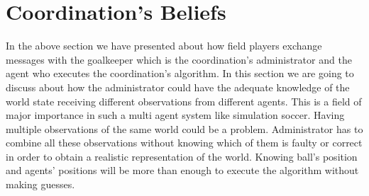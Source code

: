 \section{Coordination's Beliefs}
In the above section we have presented about how field players exchange messages with the goalkeeper which is the coordination's administrator and the agent who executes the coordination's algorithm. In this section we are going to discuss about how the administrator could have the adequate knowledge of the world state receiving different observations from different agents. This is a field of major importance in such a multi agent system like simulation soccer. Having multiple observations of the same world could be a problem. Administrator has to combine all these observations without knowing which of them is faulty or correct in order to obtain a realistic representation of the world. Knowing ball's position and agents' positions will be more than enough to execute the algorithm without making guesses.

